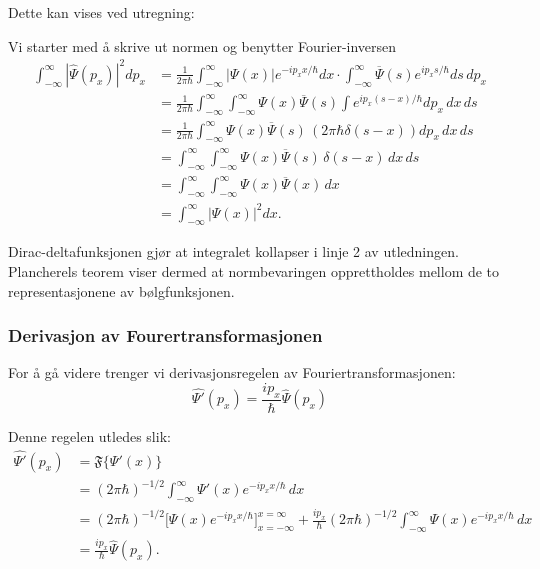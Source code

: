 \documentclass{article}
\begin{document}
Dette kan vises ved utregning:

Vi starter med å skrive ut normen og benytter Fourier-inversen
\[
\begin{aligned}
    \int_{- \infty}^{\infty}| \hat{\Psi}(p_x)|^2 dp_x &= \frac{1}{2\pi\hbar} \int_{- \infty}^{\infty} |\Psi(x)| e^{-ip_x x/\hbar} dx
     \cdot \int_{- \infty}^{\infty} \overline{\Psi}(s)e^{ip_x s/\hbar} ds \, dp_x \\
    &= \frac{1}{2\pi\hbar} \int_{- \infty}^{\infty}\int_{- \infty}^{\infty} \Psi(x) \overline{\Psi}(s) \int e^{ip_x(s-x)/\hbar} dp_x \, dx \, ds \\
    &=\frac{1}{2\pi\hbar} \int_{- \infty}^{\infty} \Psi(x) \overline{\Psi}(s) \, (2\pi\hbar\delta(s-x)) dp_x \, dx \, ds \\
    &= \int_{- \infty}^{\infty}\int_{- \infty}^{\infty} \Psi(x) \overline{\Psi}(s) \, \delta(s-x) \, dx \, ds\\
    &= \int_{- \infty}^{\infty}\int_{- \infty}^{\infty} \Psi(x) \overline{\Psi}(x) \, dx \\
    &= \int_{-\infty}^{\infty} |\Psi(x)|^2 dx.
\end{aligned}
\]

Dirac-deltafunksjonen gjør at integralet kollapser i linje 2 av utledningen. 
Plancherels teorem viser dermed at normbevaringen opprettholdes mellom de to representasjonene av bølgfunksjonen. 

\vspace{0.2in}

\subsubsection{Derivasjon av Fourertransformasjonen}
For å gå videre trenger vi derivasjonsregelen av Fouriertransformasjonen:
\begin{equation}
    \widehat{\Psi'}(p_x) = \frac{ip_x}{\hbar}\widehat{\Psi}(p_x) \label{eq:4}
\end{equation}

Denne regelen utledes slik:
\[
\begin{aligned}
    \widehat{\Psi'} (p_x) &= \mathfrak{F}\{\Psi'(x)\} \\
    &= (2\pi\hbar)^{-1/2} \int_{-\infty}^{\infty} \Psi'(x)e^{-ip_xx/\hbar} \, dx \\
    &= (2\pi\hbar)^{-1/2} \Big[ \Psi(x)e^{-ip_xx/\hbar} \Big]_{x=-\infty}^{x=\infty} 
    + \frac{ip_x}{\hbar} (2\pi\hbar)^{-1/2} \int_{-\infty}^{\infty} \Psi(x)e^{-ip_xx/\hbar} \, dx \\
    &= \frac{ip_x}{\hbar} \widehat{\Psi}(p_x).
\end{aligned}
\]
\end{document}
